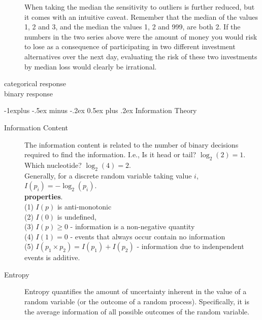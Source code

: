 \documentclass[10pt,landscape]{article}
\makeatletter
\renewcommand{\subsection}{\@startsection{subsection}{2}{0mm}%
                                {-1explus -.5ex minus -.2ex}%
                                {0.5ex plus .2ex}%
                                {\normalfont\normalsize\bfseries}}
\makeatother
\begin{document}
\begin{multicols*}{3}
\begin{description}
    When taking the median the sensitivity to outliers is further reduced,
    but it comes with an intuitive caveat. Remember that the median of the
    values 1, 2 and 3, and the median the values 1, 2 and 999, are both 2.
    If the numbers in the two series above were the amount of money you would
    risk to lose as a consequence of participating in two different investment
    alternatives over the next day, evaluating the risk of these two investments
    by median loss would clearly be irrational.


    \item[categorical response]

    \item[binary response]

    \end{description}

    \subsection{Information Theory}

    \begin{description}

    \item[Information Content] The information content is related to the
    number of binary decisions required to find the information.  I.e., Is it head or tail?
    $\log_2(2) = 1$.  Which nucleotide? $\log_2(4) = 2$. \\
    Generally, for a discrete random variable taking value $i$, $I(p_i) = -\log_2(p_i)$. \\

    \textbf{properties}. \\
    (1) $I(p)$ is anti-monotonic \\
    (2) $I(0)$ is undefined, \\
    (3) $I(p) \geq 0$ - information is a non-negative quantity \\
    (4) $I(1) = 0$ - events that always occur contain no information \\
    (5) $I(p_1 \times p_2) = I(p_1) + I(p_2)$ - information due to indenpendent
    events is additive.

    \item[Entropy] Entropy quantifies the amount of uncertainty
    inherent in the value of a random variable (or the outcome of
    a random process).  Specifically, it is the average information
    of all possible outcomes of the random variable.


\end{description}
\end{multicols*}
\end{document}
